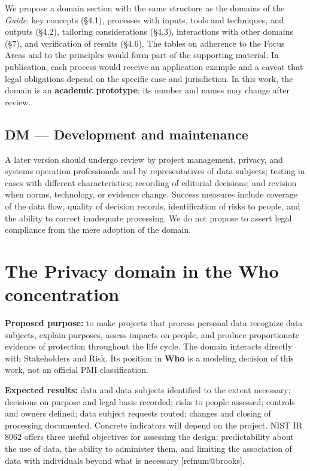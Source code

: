 \documentclass[11pt,a4paper]{article}
\makeatletter
\newcommand{\refnum}[1]{\csname refnum@#1\endcsname}
\makeatother
\begin{document}
We propose a domain section with the same structure as the domains of the \textit{Guide}: key concepts (§4.1), processes with inputs, tools and techniques, and outputs (§4.2), tailoring considerations (§4.3), interactions with other domains (§7), and verification of results (§4.6). The tables on adherence to the Focus Areas and to the principles would form part of the supporting material. In publication, each process would receive an application example and a caveat that legal obligations depend on the specific case and jurisdiction. In this work, the domain is an \textbf{academic prototype}; its number and names may change after review.
\subsection{DM — Development and maintenance}

A later version should undergo review by project management, privacy, and systems operation professionals and by representatives of data subjects; testing in cases with different characteristics; recording of editorial decisions; and revision when norms, technology, or evidence change. Success measures include coverage of the data flow, quality of decision records, identification of risks to people, and the ability to correct inadequate processing. We do not propose to assert legal compliance from the mere adoption of the domain.

\section{The Privacy domain in the Who concentration}

\textbf{Proposed purpose:} to make projects that process personal data recognize data subjects, explain purposes, assess impacts on people, and produce proportionate evidence of protection throughout the life cycle. The domain interacts directly with Stakeholders and Risk. Its position in \textbf{Who} is a modeling decision of this work, not an official PMI classification.

\textbf{Expected results:} data and data subjects identified to the extent necessary; decisions on purpose and legal basis recorded; risks to people assessed; controls and owners defined; data subject requests routed; changes and closing of processing documented. Concrete indicators will depend on the project. NIST IR 8062 offers three useful objectives for assessing the design: predictability about the use of data, the ability to administer them, and limiting the association of data with individuals beyond what is necessary [\refnum{brooks}].
\end{document}
